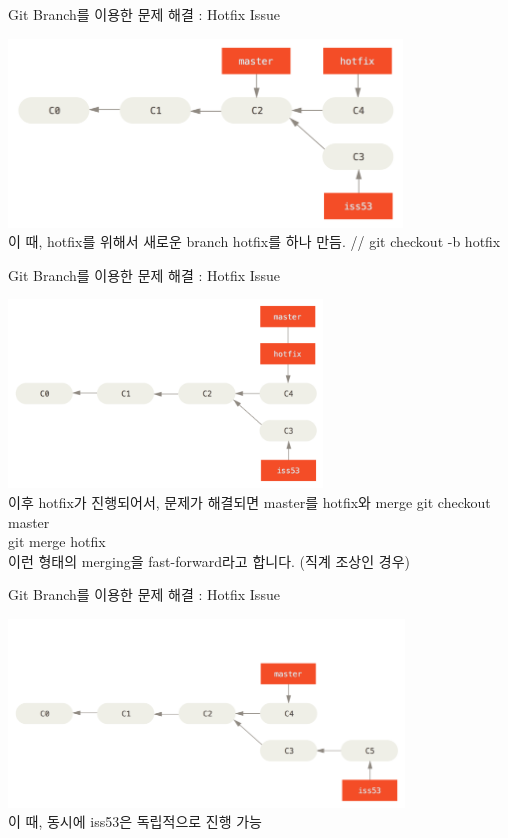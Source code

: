 \documentclass{beamer}
\begin{document}
\begin{frame}{Git Branch를 이용한 문제 해결 : Hotfix Issue} 

\includegraphics[height=5cm,keepaspectratio]{basic-branching-4}  \\
이 때, hotfix를 위해서 새로운 branch hotfix를 하나 만듬. //
git checkout -b hotfix
\end{frame}



\begin{frame}{Git Branch를 이용한 문제 해결 : Hotfix Issue} 

\includegraphics[height=5cm,keepaspectratio]{basic-branching-5}  \\
이후 hotfix가 진행되어서, 문제가 해결되면 master를 hotfix와 merge    
git checkout master\\ 
git merge hotfix \\

이런 형태의 merging을 fast-forward라고 합니다. (직계 조상인 경우)
\end{frame}

\begin{frame}{Git Branch를 이용한 문제 해결 : Hotfix Issue} 

\includegraphics[height=5cm,keepaspectratio]{basic-branching-6} \\
이 때, 동시에 iss53은 독립적으로 진행 가능
\end{frame}
\end{document}
